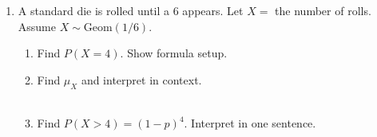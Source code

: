 \documentclass[10pt]{article}
\begin{document}
\vspace{0.1in}

\begin{practicebox}
\small
\begin{enumerate}[leftmargin=1.5em, itemsep=10pt]

  \item A standard die is rolled until a 6 appears. Let $X =$ the number of
  rolls. Assume $X \sim \text{Geom}(1/6)$.
  \begin{enumerate}[label=(\alph*), itemsep=6pt]
    \item Find $P(X = 4)$. Show formula setup.\\
          \writeline
    \item Find $\mu_X$ and interpret in context.\\
          \writeline\\[1pt]\writeline
    \item Find $P(X > 4) = (1-p)^4$. Interpret in one sentence.\\
          \writeline\\[1pt]\writeline
  \end{enumerate}

\end{enumerate}
\end{practicebox}
\end{document}
